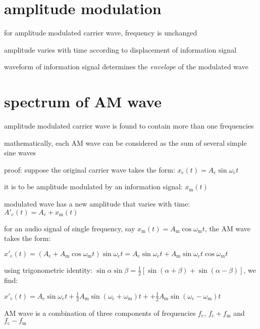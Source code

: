 \section{amplitude modulation}

for amplitude modulated carrier wave, frequency is unchanged

amplitude varies with time according to displacement of information signal

waveform of information signal determines the \emph{envelope} of the modulated wave

\section*{spectrum of AM wave}

amplitude modulated carrier wave is found to contain more than one frequencies

mathematically, each AM wave can be considered as the sum of several simple sine waves

\noindent proof: suppose the original carrier wave takes the form: $x_\text{c}(t) = A_\text{c} \sin \omega_\text{c} t$

it is to be amplitude modulated by an information signal: $x_\text{m}(t)$

modulated wave has a new amplitude that varies with time: $A'_\text{c}(t) = A_\text{c} + x_\text{m}(t)$


for an audio signal of single frequency, say $x_\text{m}(t) = A_\text{m} \cos \omega_\text{m} t$, the AM wave takes the form:

{
	\centering
	
	$x'_\text{c}(t) = (A_\text{c} + A_\text{m} \cos \omega_\text{m} t)\sin \omega_\text{c} t = A_\text{c} \sin \omega_\text{c} t + A_\text{m} \sin \omega_\text{c} t \cos \omega_\text{m} t$
	
}

using trigonometric identity: $\sin\alpha\sin\beta = \frac{1}{2}\left[ \sin(\alpha + \beta) + \sin(\alpha - \beta) \right]$, we find:

{
	\centering
	
	$x'_\text{c}(t) = A_\text{c} \sin\omega_\text{c} t + \frac{1}{2}A_\text{m} \sin(\omega_\text{c}+\omega_\text{m})t + + \frac{1}{2}A_\text{m} \sin(\omega_\text{c}-\omega_\text{m})t$
	
}

AM wave is a combination of three components of frequencies $f_\text{c}$, $f_\text{c} + f_\text{m}$ and $f_\text{c} - f_\text{m}$ \eoe

